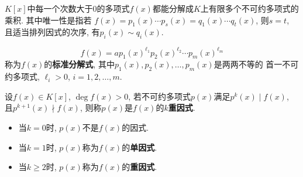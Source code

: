 \begin{Theorem}[唯一因式分解定理]
$K[x]$中每一个次数大于$0$的多项式$f(x)$都能\;\;分解成$K$上有限多个不可约多项式的乘积. 其中唯一性是指若
$f(x) = p_1(x)\cdots p_s(x) = q_1(x) \cdots q_t(x)$, 则$s=t$, 且适当排列因式的次序, 有$p_i(x) \sim q_i(x)$.
\end{Theorem}

\begin{Note}[标准分解式]
\[
f(x) = a p_1(x) ^{\ell_1} p_2(x)^{\ell_2} \cdots p_m(x)^{\ell_m}
\]
称为$f(x)$的\textbf{标准分解式}, 其中$p_1(x), p_2(x), \dots, p_m(x)$是两两不等的
首一不可约多项式, $\ell_i > 0$, $i = 1, 2, \dots, m$.
\end{Note}

\begin{Definition}
设$f(x) \in K[x]$, $\deg f(x) > 0$, 若不可约多项式$p(x)$满足$p^k(x) \mid f(x)$, 且$p^{k+1}(x) \nmid f(x)$,
则称$p(x)$是$f(x)$的\textbf{$k$重因式}. 
\begin{itemize}
\item 当$k = 0$时, $p(x)$不是$f(x)$的因式. 
\item 当$k = 1$时, $p(x)$称为$f(x)$的\textbf{单因式}.
\item 当$k \ge 2$时, $p(x)$称为$f(x)$的\textbf{重因式}.
\end{itemize}
\end{Definition}